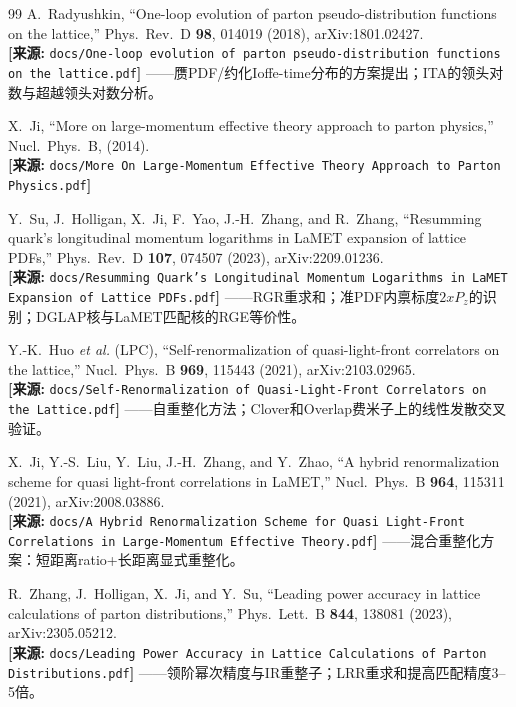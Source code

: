 \documentclass[12pt,a4paper]{ctexart}
\theoremstyle{definition}
\begin{document}
\begin{thebibliography}{99}
A.~Radyushkin, ``One-loop evolution of parton pseudo-distribution functions on the lattice,''
Phys.\ Rev.\ D \textbf{98}, 014019 (2018), arXiv:1801.02427.
\\\textbf{[来源:} \texttt{docs/One-loop evolution of parton pseudo-distribution functions on the lattice.pdf}\textbf{]}
——赝PDF/约化Ioffe-time分布的方案提出；ITA的领头对数与超越领头对数分析。

X.~Ji, ``More on large-momentum effective theory approach to parton physics,''
Nucl.\ Phys.\ B, (2014).
\\\textbf{[来源:} \texttt{docs/More On Large-Momentum Effective Theory Approach to Parton Physics.pdf}\textbf{]}

Y.~Su, J.~Holligan, X.~Ji, F.~Yao, J.-H.~Zhang, and R.~Zhang,
``Resumming quark's longitudinal momentum logarithms in LaMET expansion of lattice PDFs,''
Phys.\ Rev.\ D \textbf{107}, 074507 (2023), arXiv:2209.01236.
\\\textbf{[来源:} \texttt{docs/Resumming Quark's Longitudinal Momentum Logarithms in LaMET Expansion of Lattice PDFs.pdf}\textbf{]}
——RGR重求和；准PDF内禀标度$2xP_z$的识别；DGLAP核与LaMET匹配核的RGE等价性。

Y.-K.~Huo \textit{et al.} (LPC),
``Self-renormalization of quasi-light-front correlators on the lattice,''
Nucl.\ Phys.\ B \textbf{969}, 115443 (2021), arXiv:2103.02965.
\\\textbf{[来源:} \texttt{docs/Self-Renormalization of Quasi-Light-Front Correlators on the Lattice.pdf}\textbf{]}
——自重整化方法；Clover和Overlap费米子上的线性发散交叉验证。

X.~Ji, Y.-S.~Liu, Y.~Liu, J.-H.~Zhang, and Y.~Zhao,
``A hybrid renormalization scheme for quasi light-front correlations in LaMET,''
Nucl.\ Phys.\ B \textbf{964}, 115311 (2021), arXiv:2008.03886.
\\\textbf{[来源:} \texttt{docs/A Hybrid Renormalization Scheme for Quasi Light-Front Correlations in Large-Momentum Effective Theory.pdf}\textbf{]}
——混合重整化方案：短距离ratio+长距离显式重整化。

R.~Zhang, J.~Holligan, X.~Ji, and Y.~Su,
``Leading power accuracy in lattice calculations of parton distributions,''
Phys.\ Lett.\ B \textbf{844}, 138081 (2023), arXiv:2305.05212.
\\\textbf{[来源:} \texttt{docs/Leading Power Accuracy in Lattice Calculations of Parton Distributions.pdf}\textbf{]}
——领阶幂次精度与IR重整子；LRR重求和提高匹配精度3--5倍。


\end{thebibliography}
\end{document}
